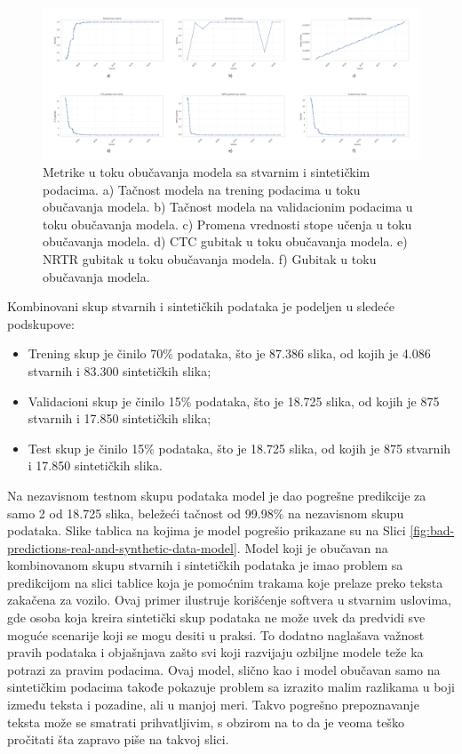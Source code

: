 \documentclass[a4paper,12pt]{article}
\begin{document}
	\begin{figure}[H]
		\centering
		\includegraphics[width=\textwidth]{assets/real-and-synthetic-data-metrics.png}
		\caption{Metrike u toku obučavanja modela sa stvarnim i sintetičkim podacima. a) Tačnost modela na trening podacima u toku obučavanja modela. b) Tačnost modela na validacionim podacima u toku obučavanja modela. c) Promena vrednosti stope učenja u toku obučavanja modela. d) CTC gubitak u toku obučavanja modela. e) NRTR gubitak u toku obučavanja modela. f) Gubitak u toku obučavanja modela.}
		\label{fig:real-and-synthetic-data-metrics}
	\end{figure}
	
	Kombinovani skup stvarnih i sintetičkih podataka je podeljen u sledeće podskupove:
	\begin{itemize}
		\item Trening skup je činilo 70\% podataka, što je 87.386 slika, od kojih je 4.086 stvarnih i 83.300 sintetičkih slika;
		\item Validacioni skup je činilo 15\% podataka, što je 18.725 slika, od kojih je 875 stvarnih i 17.850 sintetičkih slika;
		\item Test skup je činilo 15\% podataka, što je 18.725 slika, od kojih je 875 stvarnih i 17.850 sintetičkih slika.
	\end{itemize}
	
	Na nezavisnom testnom skupu podataka model je dao pogrešne predikcije za samo 2 od 18.725 slika, beležeći tačnost od 99.98\% na nezavisnom skupu podataka. Slike tablica na kojima je model pogrešio prikazane su na Slici \ref{fig:bad-predictions-real-and-synthetic-data-model}. Model koji je obučavan na kombinovanom skupu stvarnih i sintetičkih podataka je imao problem sa predikcijom na slici tablice koja je pomoćnim trakama koje prelaze preko teksta zakačena za vozilo. Ovaj primer ilustruje korišćenje softvera u stvarnim uslovima, gde osoba koja kreira sintetički skup podataka ne može uvek da predvidi sve moguće scenarije koji se mogu desiti u praksi. To dodatno naglašava važnost pravih podataka i objašnjava zašto svi koji razvijaju ozbiljne modele teže ka potrazi za pravim podacima. Ovaj model, slično kao i model obučavan samo na sintetičkim podacima takođe pokazuje problem sa izrazito malim razlikama u boji između teksta i pozadine, ali u manjoj meri. Takvo pogrešno prepoznavanje teksta može se smatrati prihvatljivim, s obzirom na to da je veoma teško pročitati šta zapravo piše na takvoj slici.
	
\end{document}

